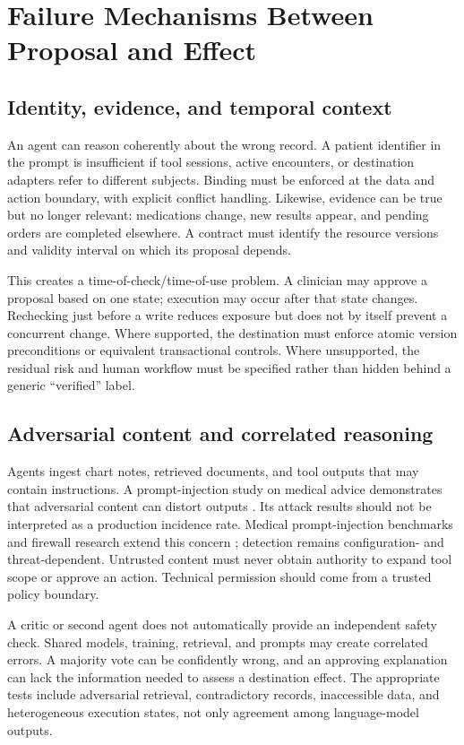 \section{Failure Mechanisms Between Proposal and Effect}
\subsection{Identity, evidence, and temporal context}
An agent can reason coherently about the wrong record. A patient identifier in the prompt is insufficient if tool sessions, active encounters, or destination adapters refer to different subjects. Binding must be enforced at the data and action boundary, with explicit conflict handling. Likewise, evidence can be true but no longer relevant: medications change, new results appear, and pending orders are completed elsewhere. A contract must identify the resource versions and validity interval on which its proposal depends.

This creates a time-of-check/time-of-use problem. A clinician may approve a proposal based on one state; execution may occur after that state changes. Rechecking just before a write reduces exposure but does not by itself prevent a concurrent change. Where supported, the destination must enforce atomic version preconditions or equivalent transactional controls. Where unsupported, the residual risk and human workflow must be specified rather than hidden behind a generic ``verified'' label.

\subsection{Adversarial content and correlated reasoning}
Agents ingest chart notes, retrieved documents, and tool outputs that may contain instructions. A prompt-injection study on medical advice demonstrates that adversarial content can distort outputs \cite{leeinjection2025}. Its attack results should not be interpreted as a production incidence rate. Medical prompt-injection benchmarks and firewall research extend this concern \cite{mpib2026,qfire2026}; detection remains configuration- and threat-dependent. Untrusted content must never obtain authority to expand tool scope or approve an action. Technical permission should come from a trusted policy boundary.

A critic or second agent does not automatically provide an independent safety check. Shared models, training, retrieval, and prompts may create correlated errors. A majority vote can be confidently wrong, and an approving explanation can lack the information needed to assess a destination effect. The appropriate tests include adversarial retrieval, contradictory records, inaccessible data, and heterogeneous execution states, not only agreement among language-model outputs.

